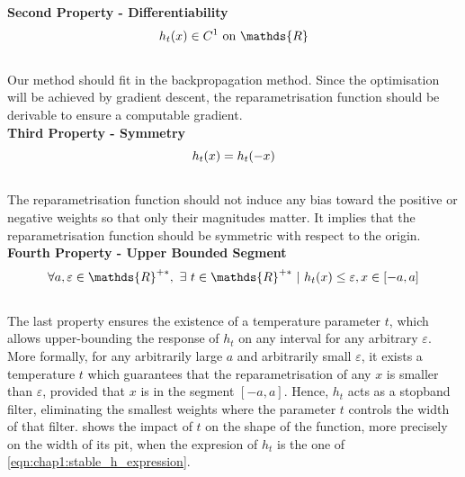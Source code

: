 \noindent\textbf{Second Property - Differentiability} \\
\begin{equation}
    \centering
    h_t(x) \in C^1 \text{ on } \mathds{R}
    \label{eqn:chap1:reparam_prop2}
\end{equation}
\\
Our method should fit in the backpropagation method. Since the optimisation will
be achieved by gradient descent, the reparametrisation function should be
derivable to ensure a computable gradient.\\

\noindent\textbf{Third Property - Symmetry} \\

\begin{equation}
    \centering
    h_t(x) = h_t(-x)
    \label{eqn:chap1:reparam_prop3}
\end{equation}
\\
The reparametrisation function should not induce any bias toward the positive or
negative weights so that only their magnitudes matter. It implies that the
reparametrisation function should be symmetric with respect to the origin.\\


\noindent\textbf{Fourth Property - Upper Bounded Segment} \\

\begin{equation}
    \centering
    \forall a,\varepsilon \in\mathds{R}^{+\ast},~ \exists ~t
    \in\mathds{R}^{+\ast} ~ | ~ h_t(x) \leq \varepsilon, x \in [-a,a]
    \label{eqn:chap1:reparam_prop4}
\end{equation}
\\
The last property ensures the existence of a temperature parameter $t$, which
allows upper-bounding the response of $h_t$ on any interval for any arbitrary
$\varepsilon$. More formally, for any arbitrarily large $a$ and arbitrarily
small $\varepsilon$, it exists a temperature $t$ which guarantees that the
reparametrisation of any $x$ is smaller than $\varepsilon$, provided that $x$ is
in the segment $[-a, a]$. Hence, $h_t$ acts as a stopband filter, eliminating
the smallest weights where the parameter $t$ controls the width of that filter.
 shows the impact of $t$ on the shape of
the function, more precisely on the width of its pit, when the expresion of
$h_t$ is the one of \cref{eqn:chap1:stable_h_expression}.\\

